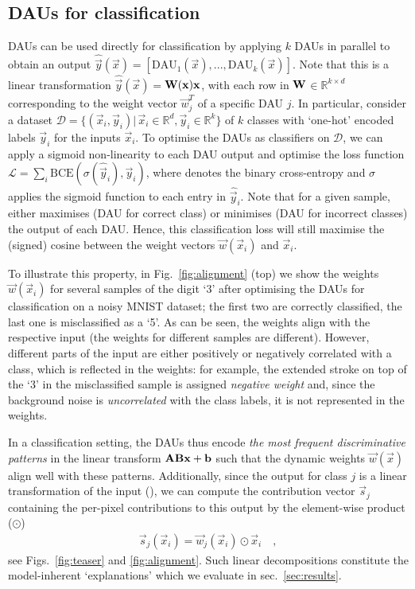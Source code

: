 \subsection{DAUs for classification}
\label{subsec:classification}
{DAUs can be used directly for classification by applying $k$ DAUs in parallel to obtain an output \mbox{$\hat{\vec y}(\vec x)=\left[\text{DAU}_1(\vec x), ..., \text{DAU}_k(\vec x)\right]$}. 
Note that this is a linear transformation $\hat{\vec y}(\vec x)$$=$$\mat W(\vec x) \vec x$, with each row in $\mat w$$\in$$\mathbb R^{k \times d}$ corresponding to the weight vector $\vec w_j^T$ of a specific DAU $j$.
In particular, consider 
a dataset $\mathcal D = \{(\vec x_i, \vec y_i)|\, \vec x_i\in\mathbb R^d, \vec y_i\in\mathbb R^k\}$ of $k$ classes with `one-hot' encoded labels $\vec y_i$ for the inputs $\vec x_i$.
To optimise the DAUs as classifiers on $\mathcal D$,} we can apply a sigmoid non-linearity to each DAU output and optimise the loss function $\mathcal L = \sum_i\text{BCE}(\sigma(\hat{\vec y}_i), \vec y_i)$, where  denotes the binary cross-entropy and $\sigma$ applies the sigmoid function to each entry in $\hat{\vec y}_i$. Note that for a given sample,  either maximises (DAU for correct class) or minimises (DAU for incorrect classes) the output of each DAU. Hence, this classification loss will still maximise the (signed) cosine between the weight vectors $\vec w(\vec x_i)$ and $\vec x_i$. 

To illustrate this property, in Fig.~\ref{fig:alignment} (top) we show the weights $\vec w(\vec x_i)$ for several samples of the digit `3' after optimising the DAUs for classification on a noisy MNIST dataset; the first two are correctly classified, the last one is misclassified as a `5'. As can be seen, the weights align with the respective input (the weights for different samples are different). However,  different parts of the input are either positively or negatively correlated with a class, which is reflected in the weights: for example, the extended stroke on top of the `3' in the misclassified sample is assigned \emph{negative weight} and, since the background noise is \emph{uncorrelated} with the class labels, it is not represented in the weights. 

In a classification setting, the DAUs {thus} encode \emph{the most frequent discriminative patterns} in the linear transform $\mat{ab}\vec x + \vec b$ such that the dynamic weights $\vec w(\vec x)$ align well with these patterns.
Additionally, since the output for class $j$ is a linear transformation of the input (), we can compute the contribution vector $\vec s_j$ containing the per-pixel contributions to this output by the element-wise product ($\odot$)
\begin{align}
\label{eq:contrib_1}
    \vec s_j(\vec x_i) = \vec w_j(\vec x_i)\odot\vec x_i\quad ,
\end{align}
 see Figs.~\ref{fig:teaser} and
\ref{fig:alignment}. 
Such linear decompositions constitute the model-inherent `explanations' which we evaluate in sec.~\ref{sec:results}.
